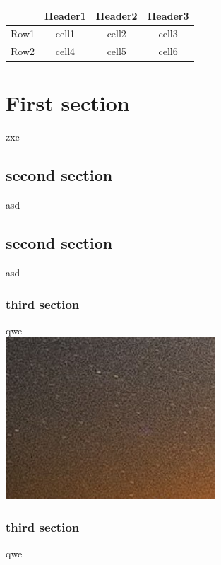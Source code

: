 \documentclass[11pt, oneside]{article}   	%
\begin{document}
\begin{center}
\begin{tabular}{ |c|c|c|c| } 
 \hline
 & Header1 & Header2 & Header3 \\ \hline
 Row1 & cell1 & cell2 & cell3 \\ 
 Row2 & cell4 & cell5 & cell6\\ 
 \hline
\end{tabular}
\end{center}


\section*{First section}
zxc
\subsection{second section}
asd
\subsection{second section}
asd
\subsubsection{third section}
qwe\\
\includegraphics{a.png}
\subsubsection{third section}
qwe
\end{document}
